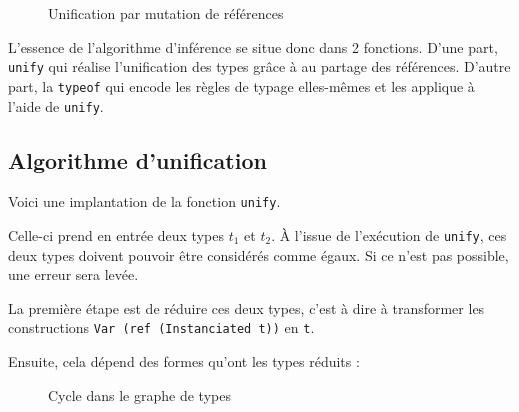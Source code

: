 \begin{figure}
  \caption{Unification par mutation de références}
  \label{fig:typeunifref}
\end{figure}

L'essence de l'algorithme d'inférence se situe donc dans 2 fonctions. D'une
part, \texttt{unify} qui réalise l'unification des types grâce à au partage des
références. D'autre part, la \texttt{typeof} qui encode les règles de typage
elles-mêmes et les applique à l'aide de \texttt{unify}.

\subsection{Algorithme d'unification}

Voici une implantation de la fonction \texttt{unify}.

Celle-ci prend en entrée deux types $t_1$ et $t_2$. À l'issue de l'exécution de
\texttt{unify}, ces deux types doivent pouvoir être considérés comme égaux. Si
ce n'est pas possible, une erreur sera levée.

La première étape est de réduire ces deux types, c'est à dire à transformer les
constructions \texttt{Var (ref (Instanciated t))} en \texttt{t}.

Ensuite, cela dépend des formes qu'ont les types réduits :

\begin{figure}
  \centering
  \caption{Cycle dans le graphe de types}
  \label{fig:typecycle}
\end{figure}

